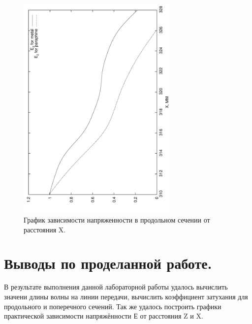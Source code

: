 \documentclass[a4paper, titlepage, 10pt]{article}
\begin{document}
\begin{figure}[h!]
 \centering
 \includegraphics[angle = 270,width=0.7\textwidth]{Ex}
 \caption{График зависимости напряженности в продольном сечении от расстояния X.}
\end{figure}

\appendix
\section*{Выводы по проделанной работе.}
В результате выполнения данной лабораторной работы удалось вычислить значени длины волны на линии передачи, вычислить коэффициент затухания для продольного и поперечного сечений. Так же удалось построить графики практической зависимости напряжённости Е от расстояния Z и X.
\end{document}
